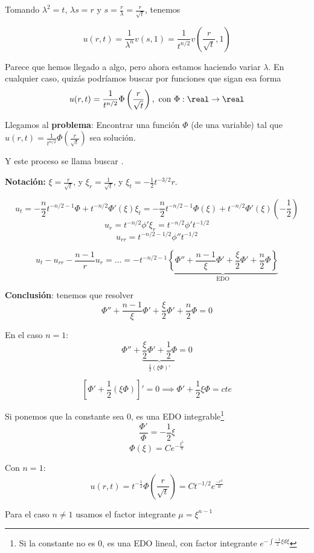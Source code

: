 		Tomando $\lambda^2 = t$, $\lambda s = r$ y $s = \frac{r}{\lambda} = \frac{r}{\sqrt{t}}$, tenemos

		\[ u(r,t) = \frac{1}{\lambda^n} v(s,1) = \frac{1}{t^{n/2}} v\left(\frac{r}{\sqrt{t}},1\right)\]

		Parece que hemos llegado a algo, pero ahora estamos haciendo variar $λ$. En cualquier caso, quizás podríamos buscar por funciones que sigan esa forma $$u(r,t) = \frac{1}{t^{n/2}} \Phi\left(\frac{r}{\sqrt{t}}\right), \text{ con }\Phi: \real \rightarrow \real$$

		Llegamos al {\bf problema}: Encontrar una función $\Phi$ (de una variable) tal que $u(r,t) = \frac{1}{t^{n/2}} \Phi(\frac{r}{\sqrt{t}})$ sea solución.

		Y este proceso se llama buscar .

		\textbf{Notación: } $\xi = \frac{r}{\sqrt{t}}$, y $\xi_r = \frac{1}{\sqrt{t}}$, y $\xi_t = -\frac{1}{2} t^{-3/2} r$.

		\[ u_t = - \frac{n}{2} t^{-n/2-1} \Phi + t^{-n/2} \Phi' (\xi) \xi_t = -\frac{n}{2} t^{-n/2 - 1} \Phi(\xi) + t^{-n/2} \Phi'(\xi) (-\frac{1}{2}) \]
		\[ u_r = t^{-n/2} \phi' \xi_r = t^{-n/2} \phi' t^{-1/2} \]
		\[ u_{rr} = t^{-n/2 - 1/2} \phi'' t^{-1/2} \]

		\[ u_t - u_{rr} - \frac{n-1}{r}u_r = … = - t^{-n/2 - 1} \underbrace{\left\{ \Phi'' + \frac{n-1}{\xi}\Phi' + \frac{\xi}{2}\Phi' + \frac{n}{2}\Phi \right\}}_{\text{EDO}} \]

		{\bf Conclusión}: tenemos que resolver
		\[ \Phi'' + \frac{n-1}{\xi} \Phi'+ \frac{\xi}{2}\Phi' + \frac{n}{2}\Phi = 0\]

		En el caso $n = 1$:
		\[ \Phi'' + \underbrace{\frac{\xi}{2}\Phi' + \frac{1}{2}\Phi}_{\frac{1}{2} (\xi \Phi)'} = 0\]

		\[ \left[ \Phi' + \frac{1}{2} (\xi \Phi)  \right]' = 0 \implies \Phi' + \frac{1}{2} \xi \Phi = cte \]

		Si ponemos que la constante sea 0, es una EDO integrable\footnote{Si la constante no es 0, es una EDO lineal, con factor integrante $e^{- \int \frac{-1}{2} \xi d\xi}$}
		\[ \frac{\Phi'}{\Phi} = -\frac{1}{2} \xi\]
		\[ \Phi(\xi) = C e^{-\frac{\xi^2}{4}}\]

		Con $n=1$:
		\[ u(r,t) = t^{-\frac{1}{2}} \Phi(\frac{r}{\sqrt{t}}) = C t^{-1/2} e^{\frac{-r^2}{4t}}\]

		Para el caso $n \neq 1$ usamos el factor integrante $\mu = \xi^{n-1}$

